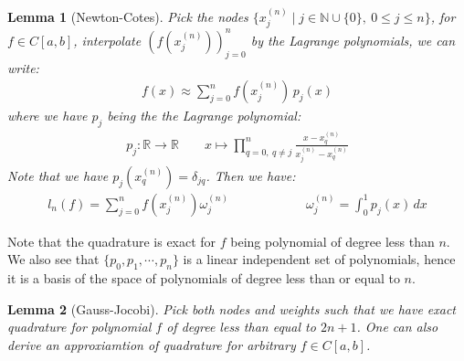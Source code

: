 \documentclass[11pt]{book}
\theoremstyle{break}
\theoremstyle{break}
\newtheorem{lem}{Lemma}[thm]
\newcommand{\R}{\mathbb{R}}
\newcommand{\N}{\mathbb{N}}
\begin{document}
\begin{lem}[Newton-Cotes]
Pick the nodes $\{ x_j^{(n)} \mid j\in \N\cup\{0\}, \ 0\leq j\leq n\}$, for $f\in C[a,b]$, interpolate $(f(x_j^{(n)}))_{j=0}^n$ by the Lagrange polynomials, we can write:
\begin{align*}
f(x) \approx \sum_{j=0}^n f(x_j^{(n)}) \, p_j(x)
\end{align*}
where we have $p_j$ being the the Lagrange polynomial:
\begin{align*}
p_j:\R \to \R \qquad x\mapsto \prod_{q=0,\ q\neq j}^n \frac{x- x_q^{(n)}}{x_j^{(n)} - x_q^{(n)}}
\end{align*}
Note that we have $p_j(x_{q}^{(n)}) = \delta_{jq}$. Then we have:
\begin{align*}
l_n(f) = \sum_{j=0}^n f(x_j^{(n)}) \omega_j^{(n)}
\qquad\qquad\qquad
\omega_j^{(n)} = \int_0^1 p_j(x)\, dx
\end{align*}
\end{lem}
Note that the quadrature is exact for $f$ being polynomial of degree less than $n$. We also see that $\{p_0, p_1,\cdots, p_n\}$ is a linear independent set of polynomials, hence it is a basis of the space of polynomials of degree less than or equal to $n$. \\

\begin{lem}[Gauss-Jocobi]
Pick both nodes and weights such that we have exact quadrature for polynomial $f$ of degree less than equal to $2n+1$. One can also derive an approxiamtion of quadrature for arbitrary $f \in C[a,b]$. 
\end{lem}
\end{document}
